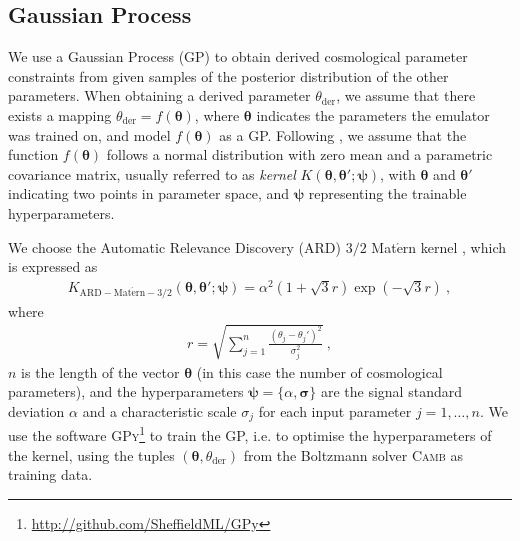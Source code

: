 \documentclass[fleqn,usenatbib]{mnras}
\begin{document}
\subsection{Gaussian Process}
\label{app:gp}
We use a Gaussian Process (GP) to obtain derived cosmological parameter constraints from given samples of the posterior distribution of the other parameters. When obtaining a derived parameter $\theta_{\textrm{der}}$, we assume that there exists a mapping $\theta_{\textrm{der}} = f(\boldsymbol{\theta})$, where $\boldsymbol{\theta}$ indicates the parameters the emulator was trained on, and model $f(\boldsymbol{\theta})$ as a GP.  Following \citet{SpurioMancini20}, we assume that the function $f(\boldsymbol{\theta})$ follows a normal distribution with zero mean and a parametric covariance matrix, usually referred to as \textit{kernel} $K \left( \boldsymbol{\theta},\boldsymbol{\theta'} ; \boldsymbol{\psi} \right)$, with $\boldsymbol{\theta}$ and $\boldsymbol{\theta'}$ indicating two points in parameter space, and $\boldsymbol{\psi}$ representing the trainable hyperparameters.

We choose the Automatic Relevance Discovery (ARD) $3/2$ Mat$\acute{\mathrm{e}}$rn kernel \citep{Neal96, Rasmussen05}, which is expressed as
\begin{align}
    K_{\mathrm{ARD-Mat}\acute{\mathrm{e}}\mathrm{rn-3/2}} \left( \boldsymbol{\theta}, \boldsymbol{\theta '}; \boldsymbol{\psi} \right) = \alpha^2 \left( 1 + \sqrt{3} r \right) \exp \left(  -\sqrt{3} r \right) \ , 
\end{align}
where
\begin{align}
    r = \sqrt{ \sum_{j=1}^n \frac{ (\theta_j - \theta_j ')^2 }{\sigma_j^2} } \ ,
\end{align}
$n$ is the length of the vector $\boldsymbol{\theta}$ (in this case the number of cosmological parameters), and the hyperparameters $\boldsymbol{\psi} = \{ \alpha, \boldsymbol{\sigma} \} $ are the signal standard deviation $\alpha$ and a characteristic scale $\sigma_j$ for each input parameter $j = 1,  \dots,  n$. We use the software \textsc{GPy}\footnote{\url{http://github.com/SheffieldML/GPy}} to train the GP, i.e. to optimise the hyperparameters of the kernel, using the tuples $\left ( \boldsymbol{\theta}, \theta_{\textrm{der}} \right )$ from the Boltzmann solver \textsc{Camb} as training data.
\end{document}
